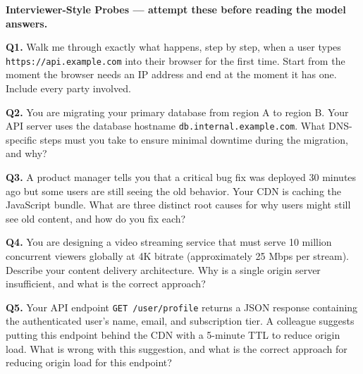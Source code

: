 \documentclass[11pt,a4paper]{article}
\begin{document}
\newpage
\begin{quizbox}
\textbf{Interviewer-Style Probes --- attempt these before reading the model answers.}

\medskip
\textbf{Q1.} Walk me through exactly what happens, step by step, when a user types \texttt{https://api.example.com} into their browser for the first time. Start from the moment the browser needs an IP address and end at the moment it has one. Include every party involved.

\medskip
\textbf{Q2.} You are migrating your primary database from region A to region B. Your API server uses the database hostname \texttt{db.internal.example.com}. What DNS-specific steps must you take to ensure minimal downtime during the migration, and why?

\medskip
\textbf{Q3.} A product manager tells you that a critical bug fix was deployed 30 minutes ago but some users are still seeing the old behavior. Your CDN is caching the JavaScript bundle. What are three distinct root causes for why users might still see old content, and how do you fix each?

\medskip
\textbf{Q4.} You are designing a video streaming service that must serve 10 million concurrent viewers globally at 4K bitrate (approximately 25 Mbps per stream). Describe your content delivery architecture. Why is a single origin server insufficient, and what is the correct approach?

\medskip
\textbf{Q5.} Your API endpoint \texttt{GET /user/profile} returns a JSON response containing the authenticated user's name, email, and subscription tier. A colleague suggests putting this endpoint behind the CDN with a 5-minute TTL to reduce origin load. What is wrong with this suggestion, and what is the correct approach for reducing origin load for this endpoint?
\end{quizbox}
\end{document}
